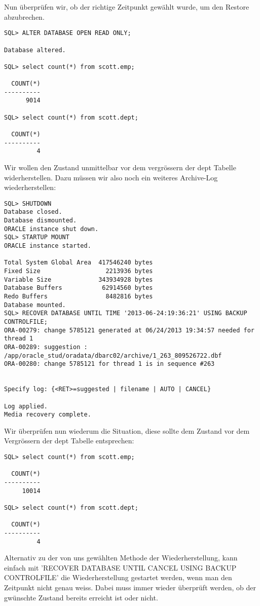 \documentclass[11pt,a4paper,parskip=half]{scrartcl}
\begin{document}
Nun überprüfen wir, ob der richtige Zeitpunkt gewählt wurde, um den Restore abzubrechen.

\begin{lstlisting}
SQL> ALTER DATABASE OPEN READ ONLY;

Database altered.

SQL> select count(*) from scott.emp;

  COUNT(*)
----------
      9014

SQL> select count(*) from scott.dept;

  COUNT(*)
----------
         4
\end{lstlisting}

Wir wollen den Zustand unmittelbar vor dem vergrössern der dept Tabelle widerherstellen. Dazu müssen wir also noch ein weiteres Archive-Log wiederherstellen:
\begin{lstlisting}
SQL> SHUTDOWN
Database closed.
Database dismounted.
ORACLE instance shut down.
SQL> STARTUP MOUNT
ORACLE instance started.

Total System Global Area  417546240 bytes
Fixed Size                  2213936 bytes
Variable Size             343934928 bytes
Database Buffers           62914560 bytes
Redo Buffers                8482816 bytes
Database mounted.
SQL> RECOVER DATABASE UNTIL TIME '2013-06-24:19:36:21' USING BACKUP CONTROLFILE;
ORA-00279: change 5785121 generated at 06/24/2013 19:34:57 needed for thread 1
ORA-00289: suggestion :
/app/oracle_stud/oradata/dbarc02/archive/1_263_809526722.dbf
ORA-00280: change 5785121 for thread 1 is in sequence #263


Specify log: {<RET>=suggested | filename | AUTO | CANCEL}

Log applied.
Media recovery complete.
\end{lstlisting}

Wir überprüfen nun wiederum die Situation, diese sollte dem Zustand vor dem Vergrössern der dept Tabelle entsprechen:

\begin{lstlisting}
SQL> select count(*) from scott.emp;

  COUNT(*)
----------
     10014

SQL> select count(*) from scott.dept;

  COUNT(*)
----------
         4
\end{lstlisting}

Alternativ zu der von uns gewählten Methode der Wiederherstellung, kann einfach mit 'RECOVER DATABASE UNTIL CANCEL USING BACKUP CONTROLFILE' die Wiederherstellung gestartet werden, wenn man den Zeitpunkt nicht genau weiss. Dabei muss immer wieder überprüft werden, ob der gwünschte Zustand bereits erreicht ist oder nicht.
\end{document}

